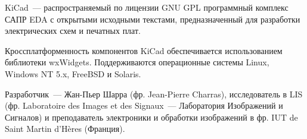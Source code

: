 

KiCad\ --- распространяемый по лицензии GNU GPL программный комплекс САПР EDA с
открытыми исходными текстами, предназначенный для разработки электрических схем
и печатных плат.

Кроссплатформенность компонентов KiCad обеспечивается использованием 
библиотеки wxWidgets. Поддерживаются операционные системы Linux, 
Windows NT 5.x, Free\-BSD и Solaris.

Разработчик\ --- Жан-Пьер Шарра (фр. Jean-Pierre Charras), исследователь 
в LIS (фр. Laboratoire des Images et des Signaux\ --- Лаборатория Изображений 
и Сигналов) и преподаватель электроники и обработки изображений в фр. 
IUT de Saint Martin d’Hères (Франция).

